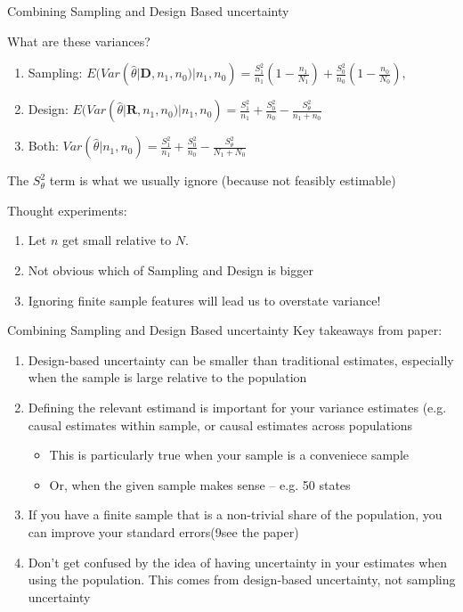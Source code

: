 \documentclass[notes,11pt, aspectratio=169]{beamer}
\newenvironment{wideitemize}{\itemize\addtolength{\itemsep}{10pt}}{\enditemize}
\begin{document}
\begin{frame}{Combining Sampling and Design Based uncertainty}
  \begin{wideitemize}
  \item  What are these variances?
  \begin{enumerate}
  \item Sampling: $E(Var(\hat{\theta} | \mathbf{D}, n_{1}, n_{0}) | n_{1}, n_{0}) = \frac{S^{2}_{1}}{n_{1}}\left(1- \frac{n_{1}}{N_{1}}\right) + \frac{S^{2}_{0}}{n_{0}}\left(1- \frac{n_{0}}{N_{0}}\right),$
  \item Design:  $E(Var(\hat{\theta} | \mathbf{R}, n_{1}, n_{0}) | n_{1}, n_{0}) = \frac{S^{2}_{1}}{n_{1}} + \frac{S^{2}_{0}}{n_{0}} - \frac{S^{2}_{\theta}}{n_{1}+n_{0}}    $
  \item Both: $Var(\hat{\theta} | n_{1}, n_{0}) = \frac{S^{2}_{1}}{n_{1}} + \frac{S^{2}_{0}}{n_{0}} - \frac{S^{2}_{\theta}}{N_{1}+N_{0}}    $
  \end{enumerate}
  The $S^{2}_{\theta}$ term is what we usually ignore (because not feasibly estimable) 
\item Thought experiments:
  \begin{enumerate}
  \item Let $n$ get small relative to $N$.
  \item Not obvious which of Sampling and Design is bigger
  \item Ignoring finite sample features will lead us to overstate variance! 
  \end{enumerate}
  \end{wideitemize}
\end{frame}


\begin{frame}{Combining Sampling and Design Based uncertainty}
  Key takeaways from paper:
  \begin{enumerate}
  \item Design-based uncertainty can be smaller than traditional estimates, especially when the sample is large relative to the population
  \item Defining the relevant estimand is important for your variance estimates (e.g. causal estimates within sample, or causal estimates across populations
    \begin{itemize}
    \item This is particularly true when your sample is a conveniece sample
    \item Or, when the given sample makes sense -- e.g. 50 states
    \end{itemize}
  \item If you have a finite sample that is a non-trivial share of the population, you can improve your standard errors(9see the paper)
  \item Don't get confused by the idea of having uncertainty in your
    estimates when using the population. This comes from design-based
    uncertainty, not sampling uncertainty
  \end{enumerate}
\end{frame}
\end{document}
